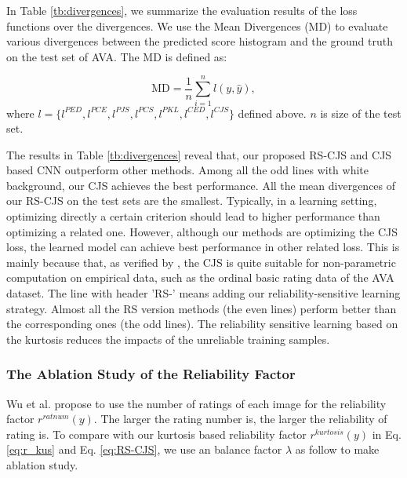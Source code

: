 \documentclass[letterpaper]{article} %
\begin{document}
In Table \ref{tb:divergences}, we summarize the evaluation results of the loss functions over the divergences. We use the Mean Divergences (MD) to evaluate various divergences between the predicted score histogram and the ground truth on the test set of AVA. The MD is defined as: 


%
\begin{equation}
\text{MD} = \frac{1}{n}\sum_{i=1}^{n}l(y,\hat{y}),
\label{eq:MD}
\end{equation}
where $l=\{l^{PED},l^{PCE},l^{PJS},l^{PCS},l^{PKL},l^{CED},l^{CJS}\}$ defined above. $n$ is size of the test set.






The results in Table \ref{tb:divergences} reveal that, our proposed RS-CJS and CJS based CNN outperform other methods. Among all the odd lines with white background, our CJS achieves the best performance. All the mean divergences of our RS-CJS on the test sets are the smallest. Typically, in a learning setting, optimizing directly a certain criterion should lead to higher performance than optimizing a related one. However, although our methods are optimizing the CJS loss, the learned model can achieve best performance in other related loss. This is mainly because that, as verified by \cite{NguyenECML2015}, the CJS is quite suitable for non-parametric computation on empirical data, such as the ordinal basic rating data of the AVA dataset. The line with header 'RS-' means adding our reliability-sensitive learning strategy. Almost all the RS version methods (the even lines) perform better than the corresponding ones (the odd lines). The reliability sensitive learning based on the kurtosis reduces the impacts of the unreliable training samples.






\subsubsection{The Ablation Study of the Reliability Factor}
Wu et al. \cite{WuICCV2011} propose to use the number of ratings of each image for the reliability factor $r^{ratnum}(y)$. The larger the rating number is, the larger the reliability of rating is. To compare with our kurtosis based reliability factor $r^{kurtosis}(y)$ in Eq. \ref{eq:r_kus} and Eq. \ref{eq:RS-CJS}, we use an balance factor $\lambda$ as follow to make ablation study.
\end{document}
